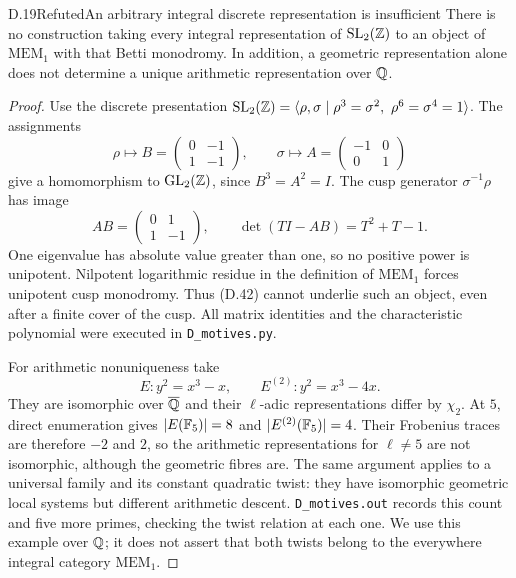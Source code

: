 \begin{statement}{D.19}{Refuted}{An arbitrary integral discrete representation is insufficient}
There is no construction taking every integral representation
of \(\operatorname{SL}_2(\mathbb Z)\) to an object of \(\mathrm{MEM}_1\) with
that Betti monodromy.  In addition, a geometric representation
alone does not determine a unique arithmetic representation
over \(\mathbb Q\).
\end{statement}
\begin{proof}
Use the discrete presentation
\(\operatorname{SL}_2(\mathbb Z)=\langle\rho,\sigma\mid\rho^3=\sigma^2,\
\rho^6=\sigma^4=1\rangle\).
The assignments
\[
 \rho\longmapsto B=\begin{pmatrix}0&-1\\1&-1\end{pmatrix},
 \qquad
 \sigma\longmapsto A=\begin{pmatrix}-1&0\\0&1\end{pmatrix}
 \tag{D.42}
\]
give a homomorphism to \(\operatorname{GL}_2(\mathbb Z)\), since
\(B^3=A^2=I\).
The cusp generator \(\sigma^{-1}\rho\) has image
\[
 AB=\begin{pmatrix}0&1\\1&-1\end{pmatrix},
 \qquad \det(TI-AB)=T^2+T-1 .
 \tag{D.43}
\]
One eigenvalue has absolute value greater than one, so
no positive power is unipotent.  Nilpotent logarithmic
residue in the definition of \(\mathrm{MEM}_1\) forces
unipotent cusp monodromy.  Thus (D.42) cannot underlie
such an object, even after a finite cover of the cusp.
All matrix identities and the characteristic polynomial
were executed in \texttt{D\_motives.py}.

For arithmetic nonuniqueness take
\[
 E:y^2=x^3-x,\qquad E^{(2)}:y^2=x^3-4x .
 \tag{D.44}
\]
They are isomorphic over \(\overline{\mathbb Q}\) and their
\(\ell\)-adic representations differ by \(\chi_2\).
At \(5\), direct enumeration gives
\(|E(\mathbb F_5)|=8\) and \(|E^{(2)}(\mathbb F_5)|=4\).
Their Frobenius traces are therefore \(-2\) and \(2\),
so the arithmetic representations for \(\ell\ne5\) are
not isomorphic, although the geometric fibres are.
The same argument applies to a universal family and its
constant quadratic twist: they have isomorphic geometric
local systems but different arithmetic descent.
\texttt{D\_motives.out} records this count and five more
primes, checking the twist relation at each one.
We use this example over \(\mathbb Q\); it does not assert that
both twists belong to the everywhere integral category
\(\mathrm{MEM}_1\).
\end{proof}

